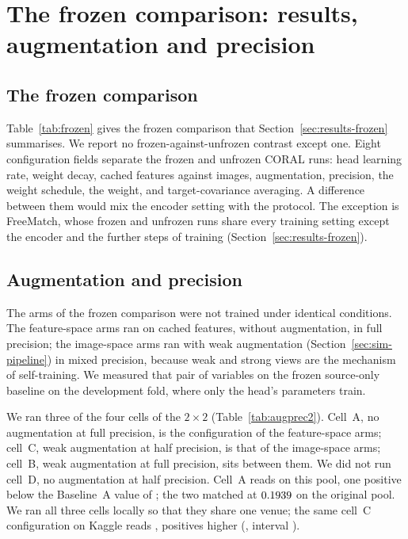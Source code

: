 \section{The frozen comparison: results, augmentation and precision}
\label{sec:augprec}

\subsection{The frozen comparison}
\label{sec:frozen-comparison}

Table~\ref{tab:frozen} gives the frozen comparison that Section~\ref{sec:results-frozen}
summarises. We report no frozen-against-unfrozen contrast except one.
Eight configuration fields separate the frozen and unfrozen CORAL runs: head learning rate,
weight decay, cached features against images, augmentation, precision, the weight schedule, the
weight, and target-covariance averaging. A difference between them would mix the encoder
setting with the protocol. The exception is FreeMatch, whose frozen and unfrozen runs share
every training setting except the encoder and the further steps of training
(Section~\ref{sec:results-frozen}).



\subsection{Augmentation and precision}
\label{sec:augprec-detail}

The arms of the frozen comparison were not trained under identical conditions. The
feature-space arms ran on cached features, without augmentation, in full precision; the
image-space arms ran with weak augmentation (Section~\ref{sec:sim-pipeline}) in mixed precision, because weak and strong views
are the mechanism of self-training. We measured that pair of variables on the frozen
source-only baseline on the development fold, where only the head's \augprecTrainableNs{}
parameters train.

We ran three of the four cells of the $2 \times 2$ (Table~\ref{tab:augprec2}). Cell~A, no
augmentation at full precision, is the configuration of the feature-space arms; cell~C, weak
augmentation at half precision, is that of the image-space arms; cell~B, weak augmentation at
full precision, sits between them. We did not run cell~D, no augmentation at half precision.
Cell~A reads \augprecCellA{} on this pool, one positive below the Baseline~A value of
\augprecBaselineFoldZero{}; the two matched at $0.1939{}$ on the original pool. We
ran all three cells locally so that they share one venue; the same cell~C configuration on
Kaggle reads \augprecCellCKaggle{}, \augprecVenueLenses{} positives higher
(\augprecVenueDiff{}, interval \augprecVenueCI).

